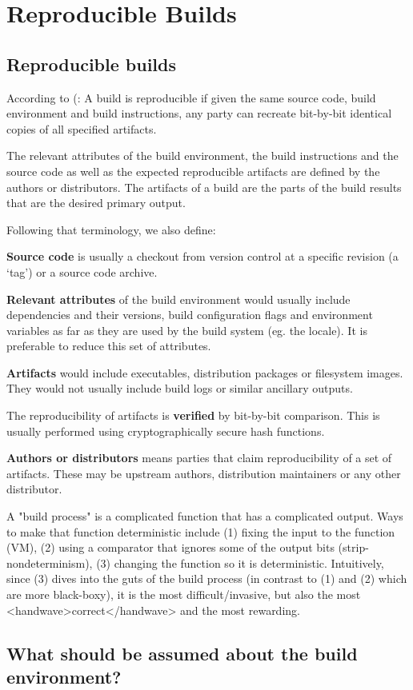\section{Reproducible Builds}
\label{SEC:reproducible-builds}


\subsection{Reproducible builds}

According to (:
A build is reproducible if given the same source code, build environment
and build instructions, any party can recreate bit-by-bit identical copies
of all specified artifacts.

The relevant attributes of the build environment, the build instructions
and the source code as well as the expected reproducible artifacts are
defined by the authors or distributors. The artifacts of a build are the
parts of the build results that are the desired primary output.


Following that terminology, we also define:

{\bf Source code} is usually a checkout from version control at a specific
revision (a `tag') or a source code archive.

{\bf Relevant attributes} of the build environment would usually include
dependencies and their versions, build configuration flags and environment
variables as far as they are used by the build system (eg. the locale). It
is preferable to reduce this set of attributes.

{\bf Artifacts} would include executables, distribution packages or filesystem
images. They would not usually include build logs or similar ancillary
outputs.

The reproducibility of artifacts is {\bf verified} by bit-by-bit comparison. 
This is usually performed using cryptographically secure hash functions.

{\bf Authors or distributors} means parties that claim reproducibility of a 
set of artifacts. These may be upstream authors, distribution maintainers or
any other distributor.

A "build process" is
a complicated function that has a complicated output.  Ways to make that
function deterministic include (1) fixing the input to the function
(VM), (2) using a comparator that ignores some of the output bits
(strip-nondeterminism), (3) changing the function so it is
deterministic.  Intuitively, since (3) dives into the guts of the build
process (in contrast to (1) and (2) which are more black-boxy), it is
the most difficult/invasive, but also the most <handwave>correct</handwave>
and the most rewarding.

\subsection{What should be assumed about the build environment?}


